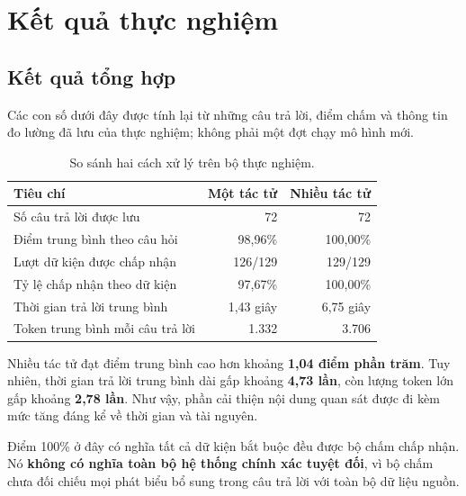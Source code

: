 \section{Kết quả thực nghiệm}

\subsection{Kết quả tổng hợp}
Các con số dưới đây được tính lại từ những câu trả lời, điểm chấm và thông tin đo lường đã lưu của thực nghiệm; không phải một đợt chạy mô hình mới. 

\begin{table}[htbp]\small
\caption{So sánh hai cách xử lý trên bộ thực nghiệm.}
\begin{tabularx}{\linewidth}{Yrr}\toprule
Tiêu chí & Một tác tử & Nhiều tác tử\\\midrule
Số câu trả lời được lưu & 72 & 72\\
Điểm trung bình theo câu hỏi & 98,96\% & 100,00\%\\
Lượt dữ kiện được chấp nhận & 126/129 & 129/129\\
Tỷ lệ chấp nhận theo dữ kiện & 97,67\% & 100,00\%\\
Thời gian trả lời trung bình & 1,43 giây & 6,75 giây\\
Token trung bình mỗi câu trả lời & 1.332 & 3.706\\\bottomrule
\end{tabularx}
\end{table}

Nhiều tác tử đạt điểm trung bình cao hơn khoảng \textbf{1,04 điểm phần trăm}. Tuy nhiên, thời gian trả lời trung bình dài gấp khoảng \textbf{4,73 lần}, còn lượng token lớn gấp khoảng \textbf{2,78 lần}. Như vậy, phần cải thiện nội dung quan sát được đi kèm mức tăng đáng kể về thời gian và tài nguyên.

Điểm 100\% ở đây có nghĩa tất cả dữ kiện bắt buộc đều được bộ chấm chấp nhận. Nó \textbf{không có nghĩa toàn bộ hệ thống chính xác tuyệt đối}, vì bộ chấm chưa đối chiếu mọi phát biểu bổ sung trong câu trả lời với toàn bộ dữ liệu nguồn.

